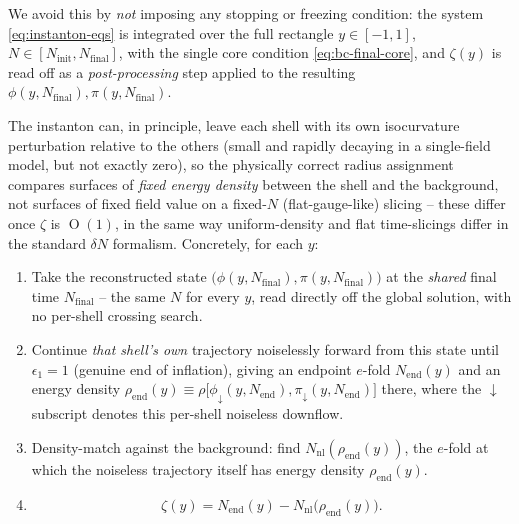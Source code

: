 \documentclass[a4paper,11pt]{article}
\newcommand{\semibold}[1]{{\fontseries{b}\selectfont{#1}}}
\DeclareMathOperator{\Or}{O}
\newcommand{\Ny}{N}                          %
\newcommand{\Ninit}{N_{\mathrm{init}}}       %
\newcommand{\Nfinal}{N_{\mathrm{final}}}     %
\newcommand{\epsSR}{\epsilon_1}              %
\newcommand{\field}{\phi}                    %
\newcommand{\mom}{\pi}                       %
\newcommand{\yco}{y}                         %
\newcommand{\zprofile}{\zeta}                %
\begin{document}
We avoid this by \emph{not} imposing any stopping or freezing condition:
the system \eqref{eq:instanton-eqs} is integrated over the full rectangle
$\yco\in[-1,1]$, $\Ny\in[\Ninit,\Nfinal]$, with the single core condition
\eqref{eq:bc-final-core}, and $\zprofile(\yco)$ is read off as a
\emph{post-processing} step applied to the resulting $\field(\yco,\Nfinal),
\mom(\yco,\Nfinal)$.

\par\vspace{0.5em}\noindent
\semibold{Scale assignment: density matching, not a crossing scan.}
The instanton can, in principle, leave each shell with its own
isocurvature perturbation relative to the others (small and rapidly
decaying in a single-field model, but not exactly zero), so the physically
correct radius assignment compares surfaces of \emph{fixed energy density}
between the shell and the background, not surfaces of fixed field value on
a fixed-$\Ny$ (flat-gauge-like) slicing -- these differ once $\zprofile$ is
$\Or(1)$, in the same way uniform-density and flat time-slicings differ in
the standard $\delta N$ formalism. Concretely, for each $\yco$:
\begin{enumerate}
    \item Take the reconstructed state $\big(\field(\yco,\Nfinal),\mom(\yco,\Nfinal)\big)$
    at the \emph{shared} final time $\Nfinal$ -- the same $\Ny$ for every
    $\yco$, read directly off the global solution, with no per-shell
    crossing search.
    \item Continue \emph{that shell's own} trajectory noiselessly forward
    from this state until $\epsSR=1$ (genuine end of inflation), giving an
    endpoint $e$-fold $\Ny_{\mathrm{end}}(\yco)$ and an energy density
    $\rho_{\mathrm{end}}(\yco) \equiv \rho\big[\field_{\downarrow}(\yco,\Ny_{\mathrm{end}}),
    \mom_{\downarrow}(\yco,\Ny_{\mathrm{end}})\big]$ there, where the
    $\downarrow$ subscript denotes this per-shell noiseless downflow.
    \item Density-match against the background: find $\Ny_{\mathrm{nl}}(\rho_{\mathrm{end}}(\yco))$,
    the $e$-fold at which the noiseless trajectory itself has energy
    density $\rho_{\mathrm{end}}(\yco)$.
    \item
    \begin{equation}
        \zprofile(\yco) = \Ny_{\mathrm{end}}(\yco) - \Ny_{\mathrm{nl}}\big(\rho_{\mathrm{end}}(\yco)\big) .
        \label{eq:zeta-extraction}
    \end{equation}
\end{enumerate}
\end{document}

